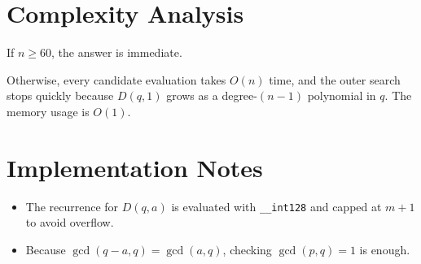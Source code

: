 \documentclass[11pt]{article}
\begin{document}
\section*{Complexity Analysis}

If $n \ge 60$, the answer is immediate.

Otherwise, every candidate evaluation takes $O(n)$ time, and the outer search stops quickly because
$D(q,1)$ grows as a degree-$(n-1)$ polynomial in $q$. The memory usage is $O(1)$.

\section*{Implementation Notes}

\begin{itemize}[leftmargin=*]
    \item The recurrence for $D(q,a)$ is evaluated with \texttt{\_\_int128} and capped at $m+1$ to avoid
    overflow.
    \item Because $\gcd(q-a,q)=\gcd(a,q)$, checking $\gcd(p,q)=1$ is enough.
\end{itemize}
\end{document}
